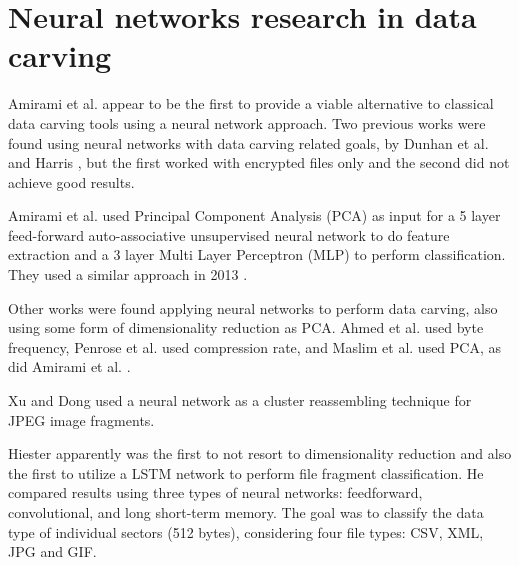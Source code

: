 \section{Neural networks research in data carving}

Amirami et al.  \cite{amirani_new_2008} appear to be the first 
to provide a viable alternative to classical data carving tools using a neural network approach. Two previous works were found using neural networks with data carving related goals, by Dunhan et al. \cite{dunham_classifying_2005} and Harris \cite{harris_using_2007}, but the first worked with encrypted files only and the second did not achieve good results.

Amirami et al.  \cite{amirani_new_2008} used Principal Component Analysis (PCA) as input for a 5 layer feed-forward auto-associative unsupervised neural network to do feature extraction and a 3 layer Multi Layer Perceptron (MLP) to perform classification. They used a similar approach in 2013 \cite{amirani_feature-based_2013}.

Other works were found applying neural networks to perform data carving, also using some form of dimensionality reduction as PCA. Ahmed et al. \cite{ahmed_content-based_2010}\cite{ahmed_fast_2011} used byte frequency, 
Penrose et al. \cite{penrose_approaches_2013} used compression rate,
and Maslim et al. \cite{maslim_distributed_2014} used PCA, as did Amirami et al.  \cite{amirani_new_2008}.

Xu and Dong \cite{xu_reassembling_2009} used a neural network as a cluster reassembling technique for JPEG image fragments.

Hiester \cite{hiester_file_2018} apparently was the first to not resort to dimensionality reduction and also the first to utilize a LSTM network to perform file fragment classification. He compared results using three types of neural networks: feedforward, convolutional, and long short-term memory. The goal was to classify the data type of individual sectors (512 bytes), considering four file types: CSV, XML, JPG and GIF.

% 